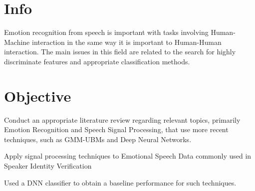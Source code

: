 \section{Info}
	Emotion recognition from speech is important with tasks involving Human-Machine interaction in the same way it is important to Human-Human interaction. The main issues in this field are related to the search for highly discriminate features and appropriate classification methods.

\section{Objective}
	Conduct an appropriate literature review regarding relevant topics, primarily Emotion Recognition and Speech Signal Processing, that use more recent techniques, such as GMM-UBMs and Deep Neural Networks.
	
	Apply signal processing techniques to Emotional Speech Data commonly used in Speaker Identity Verification
	
	Used a DNN classifier to obtain a baseline performance for such techniques.